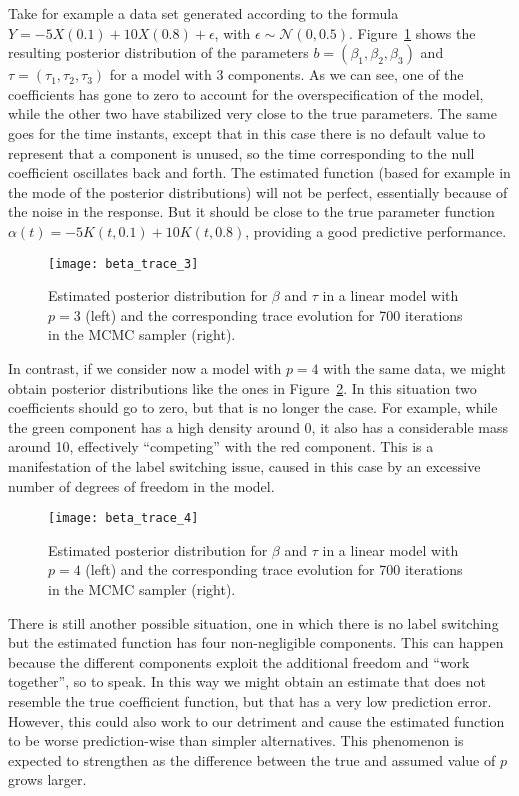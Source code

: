 Take for example a data set generated according to the formula \(Y=-5X(0.1) + 10X(0.8) + \epsilon\), with \(\epsilon\sim \mathcal N(0, 0.5)\). Figure~\ref{fig:beta_trace_3} shows the resulting posterior distribution of the parameters \(b=(\beta_1, \beta_2, \beta_3)\) and \(\tau=(\tau_1, \tau_2, \tau_3)\) for a model with 3 components. As we can see, one of the coefficients has gone to zero to account for the overspecification of the model, while the other two have stabilized very close to the true parameters. The same goes for the time instants, except that in this case there is no default value to represent that a component is unused, so the time corresponding to the null coefficient oscillates back and forth. The estimated function (based for example in the mode of the posterior distributions) will not be perfect, essentially because of the noise in the response. But it should be close to the true parameter function \(\alpha(t)=-5K(t, 0.1) + 10K(t, 0.8)\), providing a good predictive performance.

\begin{figure}[ht!]
  \centering
  \texttt{[image: beta\_trace\_3]}
  \caption{Estimated posterior distribution for \(\beta\) and \(\tau\) in a linear model with \(p=3\) (left) and the corresponding trace evolution for 700 iterations in the MCMC sampler (right).}\label{fig:beta_trace_3}
\end{figure}

In contrast, if we consider now a model with \(p=4\) with the same data, we might obtain posterior distributions like the ones in Figure~\ref{fig:beta_trace_4}. In this situation two coefficients should go to zero, but that is no longer the case. For example, while the green component has a high density around 0, it also has a considerable mass around 10, effectively ``competing'' with the red component. This is a manifestation of the label switching issue, caused in this case by an excessive number of degrees of freedom in the model.

\begin{figure}[ht!]
  \centering
  \texttt{[image: beta\_trace\_4]}
  \caption{Estimated posterior distribution for \(\beta\) and \(\tau\) in a linear model with \(p=4\) (left) and the corresponding trace evolution for 700 iterations in the MCMC sampler (right).}\label{fig:beta_trace_4}
\end{figure}

There is still another possible situation, one in which there is no label switching but the estimated function has four non-negligible components. This can happen because the different components exploit the additional freedom and ``work together'', so to speak. In this way we might obtain an estimate that does not resemble the true coefficient function, but that has a very low prediction error. However, this could also work to our detriment and cause the estimated function to be worse prediction-wise than simpler alternatives. This phenomenon is expected to strengthen as the difference between the true and assumed value of \(p\) grows larger.

